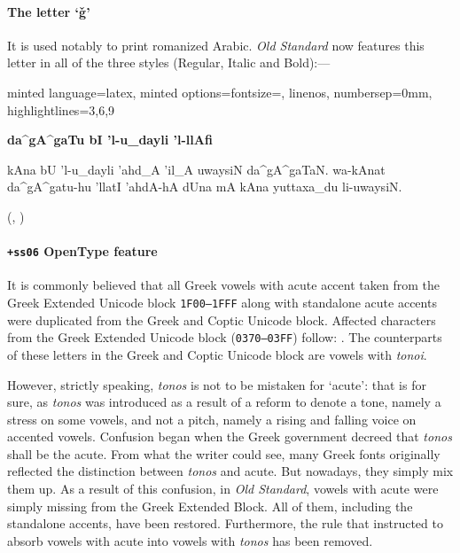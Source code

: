 \paragraph{The letter \enquote*{ǧ}} It is used notably to print
romanized Arabic. \emph{Old Standard} now features this letter in all
of the three styles (Regular, Italic and Bold):---
\begin{tcblisting}{minted language=latex, minted
    options={fontsize=\smaller, linenos, numbersep=0mm,
      highlightlines={3,6,9}}}  
  \begin{arab}[trans]
    \begin{center}
      \textbf{da^gA^gaTu bI 'l-u_dayli 'l-llAfi}
    \end{center}
    kAna bU 'l-u_dayli 'ahd_A 'il_A uwaysiN
    da^gA^gaTaN. wa-kAnat da^gA^gatu-hu 'llatI 'ahdA-hA dUna mA kAna
    yuttaxa_du li-uwaysiN.

    (, )
  \end{arab}
\end{tcblisting}

\paragraph{\texttt{+ss06} OpenType feature} It is commonly believed
that all Greek vowels with acute accent taken from the Greek Extended
Unicode block \verb|1F00–1FFF| along with standalone acute accents
were duplicated from the Greek and Coptic Unicode block. Affected
characters from the Greek Extended Unicode block (\verb|0370–03FF|)
follow: . The counterparts of these letters in the Greek and Coptic
Unicode block are vowels with \emph{tonoi}.

However, strictly speaking, \emph{tonos} is not to be mistaken for
\enquote*{acute}: that is for sure, as \emph{tonos} was introduced as
a result of a reform to denote a tone, namely a stress on some vowels,
and not a pitch, namely a rising and falling voice on accented vowels.
Confusion began when the Greek government decreed that \emph{tonos}
shall be the acute.  From what the writer could see, many Greek fonts
originally reflected the distinction between \emph{tonos} and acute.
But nowadays, they simply mix them up.  As a result of this confusion,
in \emph{Old Standard}, vowels with acute were simply missing from the
Greek Extended Block. All of them, including the standalone accents,
have been restored. Furthermore, the rule that instructed to absorb
vowels with acute into vowels with \emph{tonos} has been removed.

